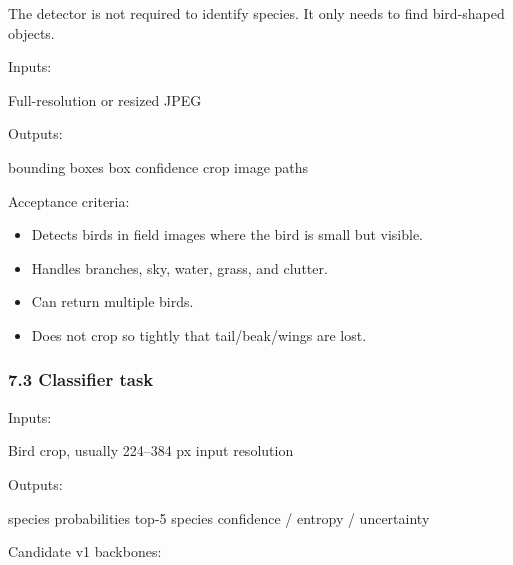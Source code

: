 \documentclass[
  11pt,
]{article}
\newenvironment{Shaded}{}{}
\newcommand{\NormalTok}[1]{#1}
\providecommand{\tightlist}{%
  \setlength{\itemsep}{0pt}\setlength{\parskip}{0pt}}
\begin{document}
The detector is not required to identify species. It only needs to find
bird-shaped objects.

Inputs:

\begin{Shaded}
\begin{Highlighting}[]
\NormalTok{Full{-}resolution or resized JPEG}
\end{Highlighting}
\end{Shaded}

Outputs:

\begin{Shaded}
\begin{Highlighting}[]
\NormalTok{bounding boxes}
\NormalTok{box confidence}
\NormalTok{crop image paths}
\end{Highlighting}
\end{Shaded}

Acceptance criteria:

\begin{itemize}
\tightlist
\item
  Detects birds in field images where the bird is small but visible.
\item
  Handles branches, sky, water, grass, and clutter.
\item
  Can return multiple birds.
\item
  Does not crop so tightly that tail/beak/wings are lost.
\end{itemize}

\subsubsection{7.3 Classifier task}\label{classifier-task}

Inputs:

\begin{Shaded}
\begin{Highlighting}[]
\NormalTok{Bird crop, usually 224–384 px input resolution}
\end{Highlighting}
\end{Shaded}

Outputs:

\begin{Shaded}
\begin{Highlighting}[]
\NormalTok{species probabilities}
\NormalTok{top{-}5 species}
\NormalTok{confidence / entropy / uncertainty}
\end{Highlighting}
\end{Shaded}

Candidate v1 backbones:
\end{document}
